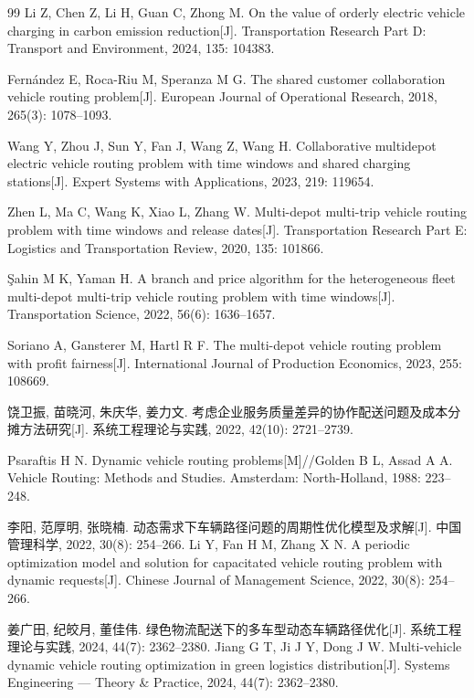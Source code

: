 \documentclass{setp-new}
\begin{document}
\begin{thebibliography}{99}
 Li Z, Chen Z, Li H, Guan C, Zhong M. On the value of orderly electric vehicle charging in carbon emission reduction[J]. Transportation Research Part D: Transport and Environment, 2024, 135: 104383.


 Fern\'{a}ndez E, Roca-Riu M, Speranza M G. The shared customer collaboration vehicle routing problem[J]. European Journal of Operational Research, 2018, 265(3): 1078--1093.


 Wang Y, Zhou J, Sun Y, Fan J, Wang Z, Wang H. Collaborative multidepot electric vehicle routing problem with time windows and shared charging stations[J]. Expert Systems with Applications, 2023, 219: 119654.


 Zhen L, Ma C, Wang K, Xiao L, Zhang W. Multi-depot multi-trip vehicle routing problem with time windows and release dates[J]. Transportation Research Part E: Logistics and Transportation Review, 2020, 135: 101866.


 Şahin M K, Yaman H. A branch and price algorithm for the heterogeneous fleet multi-depot multi-trip vehicle routing problem with time windows[J]. Transportation Science, 2022, 56(6): 1636--1657.

 Soriano A, Gansterer M, Hartl R F. The multi-depot vehicle routing problem with profit fairness[J]. International Journal of Production Economics, 2023, 255: 108669.


 饶卫振, 苗晓河, 朱庆华, 姜力文. 考虑企业服务质量差异的协作配送问题及成本分摊方法研究[J]. 系统工程理论与实践, 2022, 42(10): 2721--2739.


 Psaraftis H N. Dynamic vehicle routing problems[M]//Golden B L, Assad A A. Vehicle Routing: Methods and Studies. Amsterdam: North-Holland, 1988: 223--248.


 李阳, 范厚明, 张晓楠. 动态需求下车辆路径问题的周期性优化模型及求解[J]. 中国管理科学, 2022, 30(8): 254--266.\newline
Li Y, Fan H M, Zhang X N. A periodic optimization model and solution for capacitated vehicle routing problem with dynamic requests[J]. Chinese Journal of Management Science, 2022, 30(8): 254--266.


 姜广田, 纪皎月, 董佳伟. 绿色物流配送下的多车型动态车辆路径优化[J]. 系统工程理论与实践, 2024, 44(7): 2362--2380.\newline
Jiang G T, Ji J Y, Dong J W. Multi-vehicle dynamic vehicle routing optimization in green logistics distribution[J]. Systems Engineering --- Theory \& Practice, 2024, 44(7): 2362--2380.



\end{thebibliography}
\end{document}
